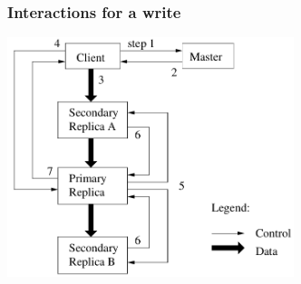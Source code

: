 \documentclass{beamer}
\newcommand{\slideheight}{7cm}
\begin{document}
\begin{frame}
 \frametitle{Interactions for a write}
 \centering
 \includegraphics[height=\slideheight]{figures/GFSflow.png}
\end{frame}
\end{document}
